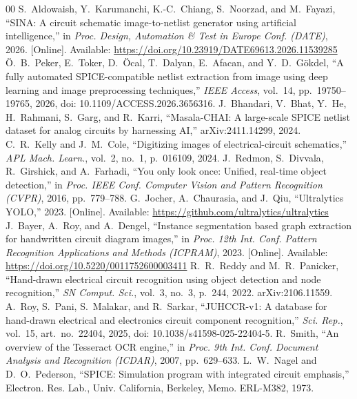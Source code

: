 \documentclass[journal]{IEEEtran}
\begin{document}
\begin{thebibliography}{00}
 S.~Aldowaish, Y.~Karumanchi, K.-C.~Chiang, S.~Noorzad, and M.~Fayazi, ``SINA: A circuit schematic image-to-netlist generator using artificial intelligence,'' in \textit{Proc. Design, Automation \& Test in Europe Conf. (DATE)}, 2026. [Online]. Available: \url{https://doi.org/10.23919/DATE69613.2026.11539285}
 \"{O}.~B.~Peker, E.~Toker, D.~\"{O}cal, T.~Dalyan, E.~Afacan, and Y.~D.~G\"{o}kdel, ``A fully automated SPICE-compatible netlist extraction from image using deep learning and image preprocessing techniques,'' \textit{IEEE Access}, vol.~14, pp.~19750--19765, 2026, doi: 10.1109/ACCESS.2026.3656316.
 J.~Bhandari, V.~Bhat, Y.~He, H.~Rahmani, S.~Garg, and R.~Karri, ``Masala-CHAI: A large-scale SPICE netlist dataset for analog circuits by harnessing AI,'' arXiv:2411.14299, 2024.
 C.~R.~Kelly and J.~M.~Cole, ``Digitizing images of electrical-circuit schematics,'' \textit{APL Mach. Learn.}, vol.~2, no.~1, p.~016109, 2024.
 J.~Redmon, S.~Divvala, R.~Girshick, and A.~Farhadi, ``You only look once: Unified, real-time object detection,'' in \textit{Proc. IEEE Conf. Computer Vision and Pattern Recognition (CVPR)}, 2016, pp.~779--788.
 G.~Jocher, A.~Chaurasia, and J.~Qiu, ``Ultralytics YOLO,'' 2023. [Online]. Available: \url{https://github.com/ultralytics/ultralytics}
 J.~Bayer, A.~Roy, and A.~Dengel, ``Instance segmentation based graph extraction for handwritten circuit diagram images,'' in \textit{Proc. 12th Int. Conf. Pattern Recognition Applications and Methods (ICPRAM)}, 2023. [Online]. Available: \url{https://doi.org/10.5220/0011752600003411}
 R.~R.~Reddy and M.~R.~Panicker, ``Hand-drawn electrical circuit recognition using object detection and node recognition,'' \textit{SN Comput. Sci.}, vol.~3, no.~3, p.~244, 2022. arXiv:2106.11559.
 A.~Roy, S.~Pani, S.~Malakar, and R.~Sarkar, ``JUHCCR-v1: A database for hand-drawn electrical and electronics circuit component recognition,'' \textit{Sci. Rep.}, vol.~15, art.~no.~22404, 2025, doi: 10.1038/s41598-025-22404-5.
 R.~Smith, ``An overview of the Tesseract OCR engine,'' in \textit{Proc. 9th Int. Conf. Document Analysis and Recognition (ICDAR)}, 2007, pp.~629--633.
 L.~W.~Nagel and D.~O.~Pederson, ``SPICE: Simulation program with integrated circuit emphasis,'' Electron. Res. Lab., Univ. California, Berkeley, Memo. ERL-M382, 1973.

\end{thebibliography}
\end{document}
